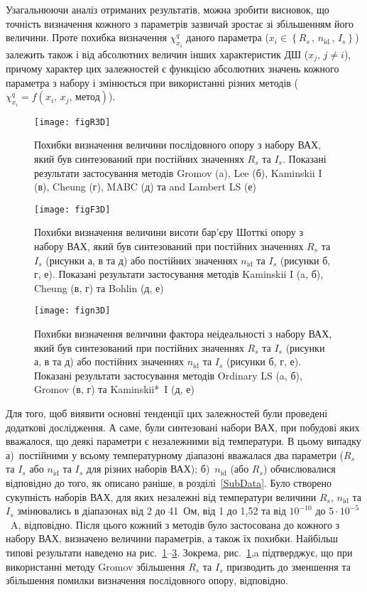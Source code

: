 Узагальнюючи аналіз отриманих результатів, можна зробити висновок, що точність визначення кожного з параметрів зазвичай зростає зі збільшенням його величини.
Проте похибка визначення $\chi^q_{x_i}$ даного параметра ($x_i\in\left\{R_s\,,\,n_\mathrm{id}\,,\, I_s\right\}$) залежить також і від абсолютних величин інших характеристик ДШ ($x_j,\,j\neq i$), причому характер цих залежностей є функцією абсолютних значень кожного параметра з набору і змінюється при використанні різних методів ($\chi^q_{x_i}=f(x_i,\,x_j,\,\text{метод})$).


\begin{figure}
\center
\texttt{[image: figR3D]}%
\caption{\label{figR3D}
Похибки визначення величини послідовного опору з набору ВАХ, який був синтезований при постійних значеннях $R_s$ та $I_s$.
Показані результати застосування методів Gromov (a), Lee (б), Kaminskii I (в), Cheung (г), MABC (д) та and Lambert LS (е)
}
\end{figure}

\begin{figure}
\center
\texttt{[image: figF3D]}%
\caption{\label{figF3D}
Похибки визначення величини висоти бар'єру Шотткі опору з набору ВАХ, який був синтезований при постійних значеннях $R_s$ та $I_s$ (рисунки а, в та д) або постійних значеннях $n_\mathrm{id}$ та $I_s$ (рисунки б, г, е).
Показані результати застосування методів Kaminskii I (a, б), Cheung (в, г) та Bohlin (д, е)
}
\end{figure}


\begin{figure}
\center
\texttt{[image: fign3D]}%
\caption{\label{fign3D}
Похибки визначення величини фактора неідеальності з набору ВАХ, який був синтезований при постійних значеннях $R_s$ та $I_s$ (рисунки а, в та д) або постійних значеннях $n_\mathrm{id}$ та $I_s$ (рисунки б, г, е).
Показані результати застосування методів Ordinary LS (a, б), Gromov (в, г) та Kaminskii*~I (д, е)
}
\end{figure}

Для того, щоб виявити основні тенденції цих залежностей були проведені додаткові дослідження.
А саме, були синтезовані набори ВАХ, при побудові яких вважалося, що деякі параметри є незалежними від температури.
В цьому випадку
а)~постійними у всьому температурному діапазоні вважалася два параметри ($R_s$ та $I_s$  або $n_\mathrm{id}$ та $I_s$ для різних наборів ВАХ);
б)~$n_\mathrm{id}$ (або $R_s$) обчислювалися відповідно до того, як описано раніше, в розділі~\ref{SubData}.
Було створено сукупність наборів ВАХ, для яких незалежні від температури величини $R_s$, $n_\mathrm{id}$ та $I_s$ змінювались в діапазонах від
2 до 41~Ом, від 1 до 1,52 та від $10^{-10}$ до $5\cdot10^{-5}$~A, відповідно.
Після цього кожний з методів було застосована до кожного з набору ВАХ, визначено величини параметрів, а також їх похибки.
Найбільш типові результати наведено на рис.~\ref{figR3D}--\ref{fign3D}.
Зокрема, рис.~\ref{figR3D},a підтверджує, що при використанні методу Gromov збільшення $R_s$ та $I_s$ призводить до зменшення та збільшення помилки визначення послідовного опору, відповідно.


